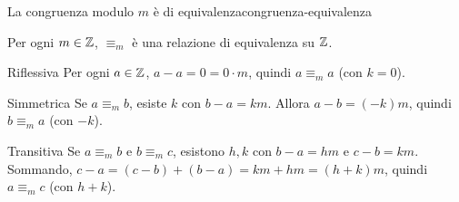 \begin{concetto}
\begin{Proposizione}{La congruenza modulo $m$ è di equivalenza}{congruenza-equivalenza}
    \begin{prerequisiti}
    \end{prerequisiti}
    Per ogni $m \in \mathbb{Z}$, $\equiv_m$ è una relazione di equivalenza su $\mathbb{Z}$.
\end{Proposizione}
\begin{dimostrazione}
    \begin{caso}{Riflessiva}
        Per ogni $a \in \mathbb{Z}$, $a - a = 0 = 0 \cdot m$, quindi $a \equiv_m a$ (con $k = 0$).
    \end{caso}
    \begin{caso}{Simmetrica}
        Se $a \equiv_m b$, esiste $k$ con $b - a = km$. Allora $a - b = (-k)m$, quindi $b \equiv_m a$ (con $-k$).
    \end{caso}
    \begin{caso}{Transitiva}
        Se $a \equiv_m b$ e $b \equiv_m c$, esistono $h, k$ con $b - a = hm$ e $c - b = km$. Sommando,
        $c - a = (c - b) + (b - a) = km + hm = (h + k)m$, quindi $a \equiv_m c$ (con $h + k$).
    \end{caso}
\end{dimostrazione}
\end{concetto}

